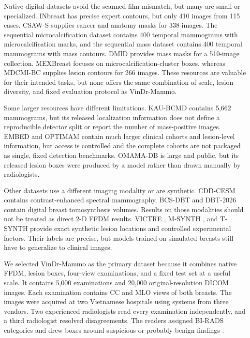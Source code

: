 Native-digital datasets avoid the scanned-film mismatch, but many are small or
specialized. INbreast \cite{moreira2012inbreast} has precise expert contours,
but only 410 images from 115 cases. CSAW-S \cite{matsoukas2020csaws} supplies
cancer and anatomy masks for 338 images. The sequential microcalcification
dataset \cite{loizidou2021microcalc} contains 400 temporal mammograms with
microcalcification marks, and the sequential mass dataset
\cite{loizidou2024masses} contains 400 temporal mammograms with mass contours.
DMID \cite{oza2024dmid} provides mass masks for a 510-image collection.
MEXBreast \cite{luna2025mexbreast} focuses on microcalcification-cluster boxes,
whereas MDCMI-BC \cite{alhejri2026mdcmi} supplies lesion contours for 266
images. These resources are valuable for their intended tasks, but none offers
the same combination of scale, lesion diversity, and fixed evaluation protocol
as VinDr-Mammo.

Some larger resources have different limitations. KAU-BCMD
\cite{alsolami2021kau} contains 5,662 mammograms, but its released localization
information does not define a reproducible detector split or report the number
of mass-positive images. EMBED \cite{jeong2023embed} and OPTIMAM
\cite{optimam2026} contain much larger clinical cohorts and lesion-level
information, but access is controlled and the complete cohorts are not packaged
as single, fixed detection benchmarks. OMAMA-DB \cite{kanamarlapudi2026omama} is
large and public, but its released lesion boxes were produced by a model rather
than drawn manually by radiologists.

Other datasets use a different imaging modality or are synthetic. CDD-CESM
\cite{khaled2022cddcesm} contains contrast-enhanced spectral mammography.
BCS-DBT \cite{buda2021bcsdbt} and DBT-2026 \cite{wu2026dbt} contain digital
breast tomosynthesis volumes. Results on those modalities should not be treated
as direct 2-D FFDM results. VICTRE \cite{badano2018victre}, M-SYNTH
\cite{sizikova2024msynth}, and T-SYNTH \cite{wiedeman2025tsynth} provide exact
synthetic lesion locations and controlled experimental factors. Their labels
are precise, but models trained on simulated breasts still have to generalize
to clinical images.

We selected VinDr-Mammo \cite{nguyen2023vindr} as the primary dataset because
it combines native FFDM, lesion boxes, four-view examinations, and a fixed test
set at a useful scale. It contains 5,000 examinations and 20,000
original-resolution DICOM images. Each examination contains CC and MLO views of
both breasts. The images were acquired at two Vietnamese hospitals using
systems from three vendors. Two experienced radiologists read every
examination independently, and a third radiologist resolved disagreements.
The readers assigned BI-RADS categories and drew boxes around suspicious or
probably benign findings \cite{nguyen2023vindr}.

